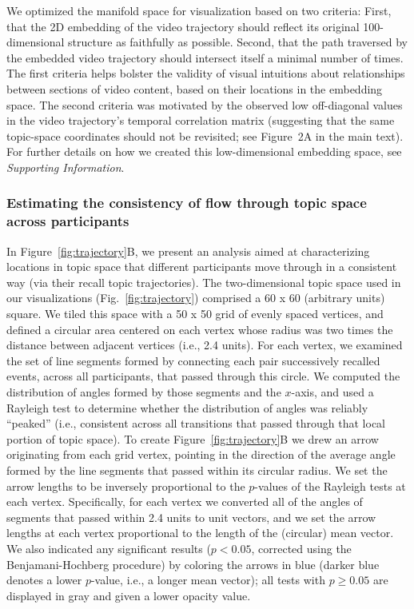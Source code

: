\documentclass{article}
\begin{document}
We optimized the manifold space for visualization based on two criteria: First, that the 2D embedding of the video trajectory should reflect its original 100-dimensional structure as faithfully as possible. Second, that the path traversed by the embedded video trajectory should intersect itself a minimal number of times.  The first criteria helps bolster the validity of visual intuitions about relationships between sections of video content, based on their locations in the embedding space.  The second criteria was motivated by the observed low off-diagonal values in the video trajectory's temporal correlation matrix (suggesting that the same topic-space coordinates should not be revisited; see Figure~2A in the main text). For further details on how we created this low-dimensional embedding space, see \textit{Supporting Information}.

\subsubsection*{Estimating the consistency of flow through topic space across participants}
In Figure~\ref{fig:trajectory}B, we present an analysis aimed at characterizing locations in topic space that different participants move through in a consistent way (via their recall topic trajectories).  The two-dimensional topic space used in our visualizations (Fig.~\ref{fig:trajectory}) comprised a 60 x 60 (arbitrary units) square.  We tiled this space with a 50 x 50 grid of evenly spaced vertices, and defined a circular area centered on each vertex whose radius was two times the distance between adjacent vertices (i.e., 2.4 units).  For each vertex, we examined the set of line segments formed by connecting each pair successively recalled events, across all participants, that passed through this circle.  We computed the distribution of angles formed by those segments and the $x$-axis, and used a Rayleigh test to determine whether the distribution of angles was reliably ``peaked'' (i.e., consistent across all transitions that passed through that local portion of topic space).  To create Figure~\ref{fig:trajectory}B we drew an arrow originating from each grid vertex, pointing in the direction of the average angle formed by the line segments that passed within its circular radius.  We set the arrow lengths to be inversely proportional to the $p$-values of the Rayleigh tests at each vertex.  Specifically, for each vertex we converted all of the angles of segments that passed within 2.4 units to unit vectors, and we set the arrow lengths at each vertex proportional to the length of the (circular) mean vector.  We also indicated any significant results ($p < 0.05$, corrected using the Benjamani-Hochberg procedure) by coloring the arrows in blue (darker blue denotes a lower $p$-value, i.e., a longer mean vector); all tests with $p \geq 0.05$ are displayed in gray and given a lower opacity value.
\end{document}
